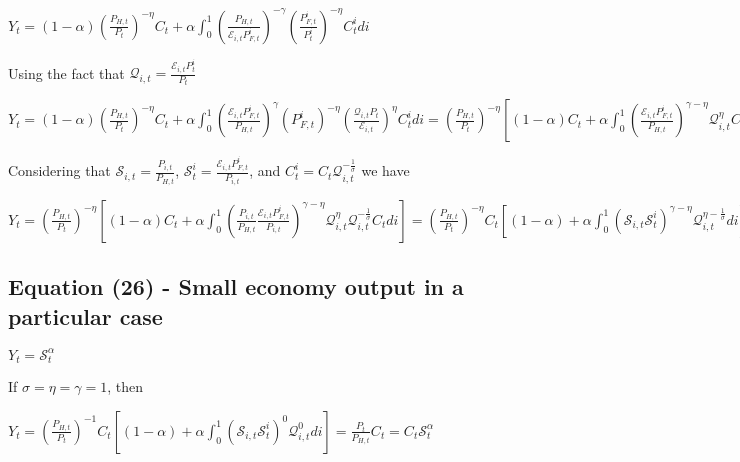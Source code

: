 \documentclass[
]{article}
\begin{document}
\(\displaystyle Y_t = (1-\alpha)\left( \frac{P_{H,t}}{P_t} \right)^{-\eta}C_t + \alpha \int_0^1 \left( \frac{P_{H,t}}{\mathcal{E}_{i,t}P_{F,t}^i}\right)^{-\gamma} \left( \frac{P_{F,t}^i}{P_t^i} \right)^{-\eta} C_t^i di\)

Using the fact that
\(\displaystyle \mathcal{Q}_{i,t}= \frac{\mathcal{E}_{i,t} P_t^i}{P_t}\)

\(\displaystyle Y_t = (1-\alpha)\left( \frac{P_{H,t}}{P_t} \right)^{-\eta}C_t + \alpha \int_0^1 \left( \frac{\mathcal{E}_{i,t}P_{F,t}^i}{P_{H,t}}\right)^{\gamma} \left( P_{F,t}^i \right)^{-\eta} \left( \frac{\mathcal{Q}_{i,t}P_t}{\mathcal{E}_{i,t}} \right)^\eta C_t^i di = \left( \frac{P_{H,t}}{P_t} \right)^{-\eta} \left[ (1-\alpha)C_t + \alpha \int_0^1 \left( \frac{\mathcal{E}_{i,t}P_{F,t}^i}{P_{H,t}}\right)^{\gamma-\eta} \mathcal{Q}_{i,t}^\eta C_t^i di \right]\)

Considering that
\(\displaystyle \mathcal{S}_{i,t}=\frac{P_{i,t}}{P_{H,t}}\),
\(\displaystyle \mathcal{S}_t^i=\frac{\mathcal{E}_{i,t} P_{F,t}^i}{P_{i,t}}\),
and \(C_{t}^i=C_t \mathcal{Q}_{i,t}^{-\frac{1}{\sigma}}\) we have

\(\displaystyle Y_t = \left( \frac{P_{H,t}}{P_t} \right)^{-\eta} \left[ (1-\alpha)C_t + \alpha \int_0^1 \left( \frac{P_{i,t}}{P_{H,t}} \frac{\mathcal{E}_{i,t}P_{F,t}^i}{P_{i,t}}\right)^{\gamma-\eta} \mathcal{Q}_{i,t}^\eta \mathcal{Q}_{i,t}^{-\frac{1}{\sigma}} C_t di \right] = \left( \frac{P_{H,t}}{P_t} \right)^{-\eta}C_t \left[ (1-\alpha) + \alpha \int_0^1 \left( \mathcal{S}_{i,t} \mathcal{S}_t^i\right)^{\gamma-\eta} \mathcal{Q}_{i,t}^{\eta-\frac{1}{\sigma}} di \right]\)

\vspace{12pt}

\hypertarget{equation-26---small-economy-output-in-a-particular-case}{%
\subsection{Equation (26) - Small economy output in a particular
case}\label{equation-26---small-economy-output-in-a-particular-case}}

\(Y_t = \mathcal{S}_t^\alpha\)

\vspace{8pt}

If \(\sigma=\eta=\gamma=1\), then

\(\displaystyle Y_t = \left( \frac{P_{H,t}}{P_t} \right)^{-1} C_t \left[ (1-\alpha) + \alpha \int_0^1 \left( \mathcal{S}_{i,t} \mathcal{S}_t^i\right)^{0} \mathcal{Q}_{i,t}^{0} di \right] = \frac{P_{t}}{P_{H,t}} C_t=C_t \mathcal{S}_t^\alpha\)
\end{document}
